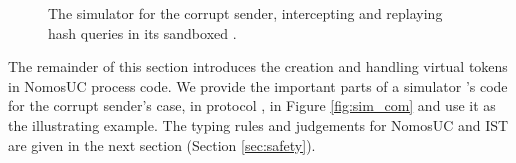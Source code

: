 
\begin{figure*}

\caption{The simulator for the corrupt sender, intercepting and replaying hash queries in its sandboxed \Fro.}
\label{fig:simcom}
\end{figure*}

The remainder of this section introduces the creation and handling virtual
tokens in NomosUC process code.  We provide the important parts of a simulator
\simcom's code for the corrupt sender's case, in protocol \protcom, in Figure
\ref{fig:sim_com} and use it as the illustrating example.  The typing rules and
judgements for NomosUC and IST are given in the next section (Section
\ref{sec:safety}).

